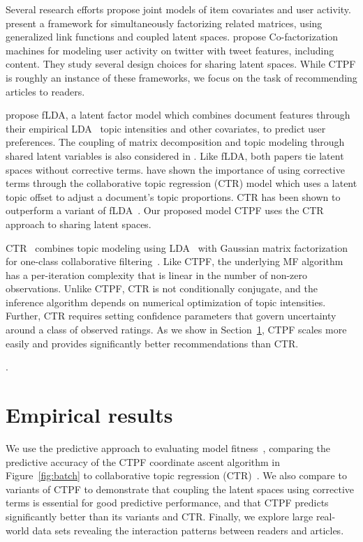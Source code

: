 \documentclass{article}
\newcommand{\mysec}[1]{Section~\ref{sec:#1}}
\newcommand{\myfig}[1]{Figure~\ref{fig:#1}}
\begin{document}
Several research efforts propose joint models of item covariates and
user activity. \citet{Singh:2008} present a framework for
simultaneously factorizing related matrices, using generalized link
functions and coupled latent spaces. \citet{Hong:2013} propose
Co-factorization machines for modeling user activity on twitter with
tweet features, including content. They study several design choices
for sharing latent spaces. While CTPF is roughly an instance of these
frameworks, we focus on the task of recommending articles to readers.

\citet{Agarwal:2010} propose fLDA, a latent factor model which
combines document features through their empirical
LDA~\cite{Blei:2003b} topic intensities and other covariates, to
predict user preferences. The coupling of matrix decomposition and
topic modeling through shared latent variables is also considered in
\cite{Shan:2010,Zhang:2012}. Like fLDA, both papers tie latent spaces
without corrective terms. \citet{Wang:2011a} have shown the importance
of using corrective terms through the collaborative topic regression
(CTR) model which uses a latent topic offset to adjust a document's
topic proportions. CTR has been shown to outperform a variant of
fLDA~\cite{Wang:2011a}. Our proposed model CTPF uses the CTR approach
to sharing latent spaces.

CTR~\cite{Wang:2011a} combines topic modeling using
LDA~\cite{Blei:2003b} with Gaussian matrix factorization for one-class
collaborative filtering~\cite{Hu:2008}. Like CTPF, the underlying MF
algorithm has a per-iteration complexity that is linear in the number
of non-zero observations. Unlike CTPF, CTR is not conditionally
conjugate, and the inference algorithm depends on numerical
optimization of topic intensities. Further, CTR requires setting
confidence parameters that govern uncertainty around a class of
observed ratings. As we show in \mysec{eval}, CTPF scales more easily
and provides significantly better recommendations than CTR.

. 


\vspace{-0.7cm}
\section{Empirical results}
\label{sec:eval}
We use the predictive approach to evaluating model
fitness~\cite{Geisser:1979}, comparing the predictive accuracy of the
CTPF coordinate ascent algorithm in \myfig{batch} to collaborative
topic regression (CTR)~\cite{Wang:2011}. We also compare to variants
of CTPF to demonstrate that coupling the latent spaces using
corrective terms is essential for good predictive performance, and
that CTPF predicts significantly better than its variants and
CTR. Finally, we explore large real-world data sets revealing the
interaction patterns between readers and articles.
\end{document}
